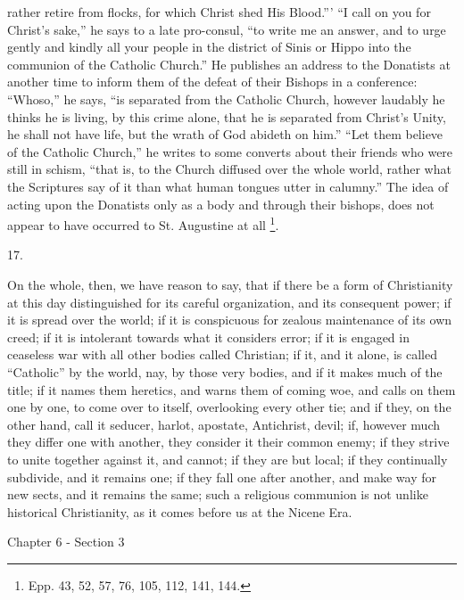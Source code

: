 rather retire from flocks, for which Christ shed His Blood.''' ``I call on you for Christ's
sake,'' he says to a late pro-consul, ``to write
me an answer, and to urge gently and kindly all your
people in the district of Sinis or Hippo into the
communion of the Catholic Church.'' He publishes an
address to the Donatists at another time to inform them
of the defeat of their Bishops in a conference:
``Whoso,'' he says, ``is separated from the
Catholic Church, however laudably he thinks he is living,
by this crime alone, that he is separated from Christ's
Unity, he shall not have life, but the wrath of God
abideth on him.'' ``Let them believe of the
Catholic Church,'' he writes to some converts about
their friends who were still in schism, ``that is, to
the Church diffused over the whole world, rather what the
Scriptures say of it than what human tongues utter in
calumny.'' The idea of acting upon the Donatists only
as a body and through their bishops, does not appear to
have occurred to St. Augustine at all \footnote{Epp. 43, 52, 57, 76, 105,
112, 141, 144.}.

17.

On the whole, then, we have reason to say, that if
there be a form of Christianity at this day distinguished
for its careful organization, and its consequent power;
if it is spread over the world; if it is conspicuous for
zealous maintenance of its own creed; if it is intolerant
towards what it considers error; if it is engaged in
ceaseless war with all other bodies called Christian; if
it, and it alone, is called ``Catholic'' by the
world, nay, by those very bodies, and if it makes much of
the title; if it names them heretics, and warns them of
coming woe, and calls on them one by one, to come over to
itself, overlooking every other tie; and if they, on the
other hand, call it seducer, harlot, apostate,
Antichrist, devil; if, however much they differ one with
another, they consider it their common enemy; if they
strive to unite together against it, and cannot; if they are but local; if they continually subdivide, and it
remains one; if they fall one after another, and make way
for new sects, and it remains the same; such a religious
communion is not unlike historical Christianity, as it
comes before us at the Nicene Era.

Chapter 6 - Section 3


